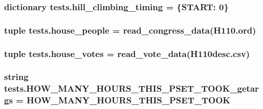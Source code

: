 \subsubsection[{hill\+\_\+climbing\+\_\+timing}]{\setlength{\rightskip}{0pt plus 5cm}dictionary tests.\+hill\+\_\+climbing\+\_\+timing = \{\textquotesingle{}S\+T\+A\+R\+T\textquotesingle{}\+: 0\}}\label{namespacetests_a187bd1fb98a53370c815d1db888282e2}
\hypertarget{namespacetests_a8f6f8292cd13d4fbdb36cf4d430a703c}{}
\subsubsection[{house\+\_\+people}]{\setlength{\rightskip}{0pt plus 5cm}tuple tests.\+house\+\_\+people = read\+\_\+congress\+\_\+data(\textquotesingle{}H110.\+ord\textquotesingle{})}\label{namespacetests_a8f6f8292cd13d4fbdb36cf4d430a703c}
\hypertarget{namespacetests_abda5725c592333b8525d7cff7ca83cfc}{}
\subsubsection[{house\+\_\+votes}]{\setlength{\rightskip}{0pt plus 5cm}tuple tests.\+house\+\_\+votes = read\+\_\+vote\+\_\+data(\textquotesingle{}H110desc.\+csv\textquotesingle{})}\label{namespacetests_abda5725c592333b8525d7cff7ca83cfc}
\hypertarget{namespacetests_a94aac3be859329ae064e39e582dc4ba3}{}
\subsubsection[{H\+O\+W\+\_\+\+M\+A\+N\+Y\+\_\+\+H\+O\+U\+R\+S\+\_\+\+T\+H\+I\+S\+\_\+\+P\+S\+E\+T\+\_\+\+T\+O\+O\+K\+\_\+getargs}]{\setlength{\rightskip}{0pt plus 5cm}string tests.\+H\+O\+W\+\_\+\+M\+A\+N\+Y\+\_\+\+H\+O\+U\+R\+S\+\_\+\+T\+H\+I\+S\+\_\+\+P\+S\+E\+T\+\_\+\+T\+O\+O\+K\+\_\+getargs = \textquotesingle{}H\+O\+W\+\_\+\+M\+A\+N\+Y\+\_\+\+H\+O\+U\+R\+S\+\_\+\+T\+H\+I\+S\+\_\+\+P\+S\+E\+T\+\_\+\+T\+O\+O\+K\textquotesingle{}}\label{namespacetests_a94aac3be859329ae064e39e582dc4ba3}


